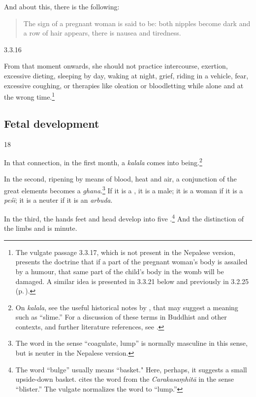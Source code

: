 \begin{translation}
And about this, there is the following:

\begin{quote}
    The sign of a pregnant woman is said to be: both nipples become
dark and a row of hair appears, there is nausea
and tiredness.
\end{quote}

\item[3.3.16]

From that moment onwards, she should not practice intercourse,
exertion, excessive dieting, sleeping by day, waking at night, grief,
riding in a vehicle, fear, excessive coughing, or therapies like
oleation or bloodletting while alone and at the wrong
time.\footnote{The vulgate passage 3.3.17, which is not present in the
    Nepalese version, presents the doctrine that if a part of the pregnant
    woman's body is assailed by a humour, that same part of the child's
    body in the womb will be damaged.  A similar idea is presented in 
    3.3.21 below and previously in 3.2.25 (p.\,\pageref{3.2.25}).}


\subsection{Fetal development}

\item [18]

In that connection, in the first month, a \emph{kalala} comes into
being.\footnote{On \emph{kalala}, see the useful historical notes by
    \citet[535--536]{das-2003}, that may suggest a meaning such as
    “slime.”  For a discussion of these terms in Buddhist and other
    contexts, and further literature references, see
    \cite{agos-2004,krit-2013,krit-2009,sune-1991}. }
    
In the second, ripening by means of blood, heat and air, a conjunction
of the great elements becomes a \emph{ghana}.\footnote{The word
     in the sense “coagulate, lump” is normally masculine in
    this sense, but is neuter in the Nepalese version.}  If it is a
    , it is a male; it is a woman if it is a
    \emph{peśī}; it is a neuter if it is an \emph{arbuda}.
        
In the third, the hands feet and head develop into five
.\footnote{The word  “bulge” usually
    means “basket."  Here, perhaps, it suggests a small upside-down
    basket. \cite[652]{moni-sans} cites the word from the
    \emph{Carakasaṃhitā} in the sense “blister.”  The vulgate normalizes
    the word to  “lump.”}  And the distinction of the limbs
    and  is minute.
        

\end{translation}
